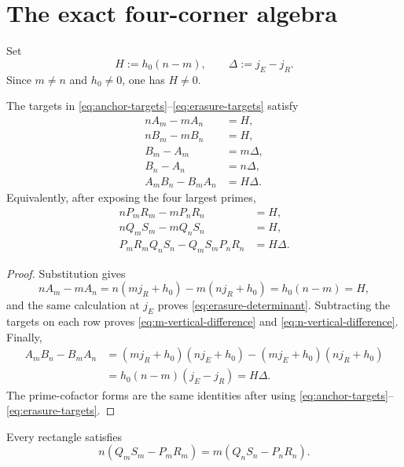 \section{The exact four-corner algebra}
\label{sec:four-corner}

Set
\begin{equation}
 H:=h_0(n-m),\qquad
 \Delta:=j_E-j_R.
 \label{eq:H-Delta}
\end{equation}
Since \(m\ne n\) and \(h_0\ne0\), one has \(H\ne0\).

\begin{theorem}
\label{thm:four-corner-identities}
The targets in \eqref{eq:anchor-targets}--\eqref{eq:erasure-targets}
satisfy
\begin{align}
 nA_m-mA_n&=H,
 \label{eq:anchor-determinant}\\
 nB_m-mB_n&=H,
 \label{eq:erasure-determinant}\\
 B_m-A_m&=m\Delta,
 \label{eq:m-vertical-difference}\\
 B_n-A_n&=n\Delta,
 \label{eq:n-vertical-difference}\\
 A_mB_n-B_mA_n&=H\Delta.
 \label{eq:cross-determinant}
\end{align}
Equivalently, after exposing the four largest primes,
\begin{align}
 nP_mR_m-mP_nR_n&=H,
 \label{eq:anchor-prime-determinant}\\
 nQ_mS_m-mQ_nS_n&=H,
 \label{eq:erasure-prime-determinant}\\
 P_mR_mQ_nS_n-Q_mS_mP_nR_n&=H\Delta.
 \label{eq:prime-cross-determinant}
\end{align}
\end{theorem}

\begin{proof}
Substitution gives
\[
 nA_m-mA_n
 =n(mj_R+h_0)-m(nj_R+h_0)
 =h_0(n-m)=H,
\]
and the same calculation at \(j_E\) proves
\eqref{eq:erasure-determinant}.  Subtracting the targets on each row
proves \eqref{eq:m-vertical-difference} and
\eqref{eq:n-vertical-difference}.  Finally,
\begin{align*}
 A_mB_n-B_mA_n
 &=(mj_R+h_0)(nj_E+h_0)
   -(mj_E+h_0)(nj_R+h_0)\\
 &=h_0(n-m)(j_E-j_R)
 =H\Delta.
\end{align*}
The prime-cofactor forms are the same identities after using
\eqref{eq:anchor-targets}--\eqref{eq:erasure-targets}.
\end{proof}

\begin{corollary}
\label{cor:two-time-compatibility}
Every rectangle satisfies
\begin{equation}
 n(Q_mS_m-P_mR_m)
 =
 m(Q_nS_n-P_nR_n).
 \label{eq:two-time-compatibility}
\end{equation}
\end{corollary}

